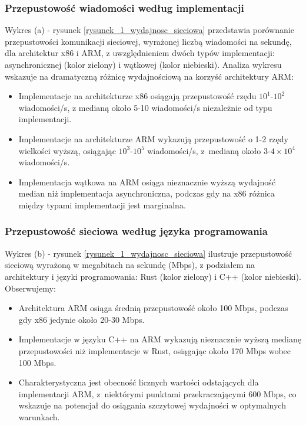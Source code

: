 \subsubsection{Przepustowość wiadomości według implementacji}
Wykres (a) - rysunek \ref{rysunek_1_wydajnosc_sieciowa} przedstawia porównanie przepustowości komunikacji sieciowej, wyrażonej liczbą wiadomości na sekundę, dla architektur x86 i ARM, z uwzględnieniem dwóch typów implementacji: asynchronicznej (kolor zielony) i wątkowej (kolor niebieski). Analiza wykresu wskazuje na dramatyczną różnicę wydajnościową na korzyść architektury ARM:
\begin{itemize}
    \item Implementacje na architekturze x86 osiągają przepustowość rzędu $10^1$-$10^2$ wiadomości/s, z medianą około 5-10 wiadomości/s niezależnie od typu implementacji.
    \item Implementacje na architekturze ARM wykazują przepustowość o 1-2 rzędy wielkości wyższą, osiągając $10^3$-$10^5$ wiadomości/s, z~medianą około $3$-$4\times10^4$ wiadomości/s.
    \item Implementacja wątkowa na ARM osiąga nieznacznie wyższą wydajność median niż implementacja asynchroniczna, podczas gdy na x86 różnica między typami implementacji jest marginalna.
\end{itemize}

\subsubsection{Przepustowość sieciowa według języka programowania}
Wykres (b) - rysunek \ref{rysunek_1_wydajnosc_sieciowa} ilustruje przepustowość sieciową wyrażoną w megabitach na sekundę (Mbps), z podziałem na architektury i języki programowania: Rust (kolor zielony) i C++ (kolor niebieski). Obserwujemy:
\begin{itemize}
    \item Architektura ARM osiąga średnią przepustowość około 100 Mbps, podczas gdy x86 jedynie około 20-30 Mbps.
    \item Implementacje w języku C++ na ARM wykazują nieznacznie wyższą medianę przepustowości niż implementacje w Rust, osiągając około 170 Mbps wobec 100 Mbps.
    \item Charakterystyczna jest obecność licznych wartości odstających dla implementacji ARM, z~niektórymi punktami przekraczającymi 600 Mbps, co wskazuje na potencjał do osiągania szczytowej wydajności w optymalnych warunkach.
\end{itemize}


